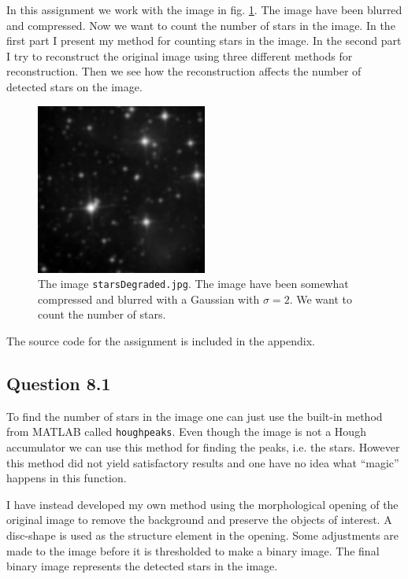 \documentclass[a4paper, 10pt, final]{article}
\title{\mytitle}
\subtitle{\mysubtitle}
\author{\myauthor{} - \mymail}
\date{\mydate}
\begin{document}
\maketitle

In this assignment we work with the image in fig. \ref{starsDegraded}.
The image have been blurred and compressed. Now we want to count the
number of stars in the image. In the first part I present my method for
counting stars in the image. In the second part I try to reconstruct the
original image using three different methods for reconstruction. Then we
see how the reconstruction affects the number of detected stars on the
image.

\begin{figure}[h!]
    \centering
    \includegraphics[width=0.5\textwidth]{images/starsDegraded}
    \caption{The image \texttt{starsDegraded.jpg}. The image have been
    somewhat compressed and blurred with a Gaussian with $\sigma = 2$.
    We want to count the number of stars.}
    \label{starsDegraded}
\end{figure}

The source code for the assignment is included in the appendix.

\subsection*{Question 8.1}
To find the number of stars in the image one can just use the built-in
method from MATLAB called \texttt{houghpeaks}. Even though the image is
not a Hough accumulator we can use this method for finding the peaks,
i.e. the stars. However this method did not yield satisfactory results
and one have no idea what ``magic'' happens in this function.

I have instead developed my own method using the morphological opening
of the original image to remove the background and preserve the objects
of interest. A disc-shape is used as the structure element in the
opening. Some adjustments are made to the image before it is thresholded
to make a binary image. The final binary image represents the detected
stars in the image.
\end{document}
